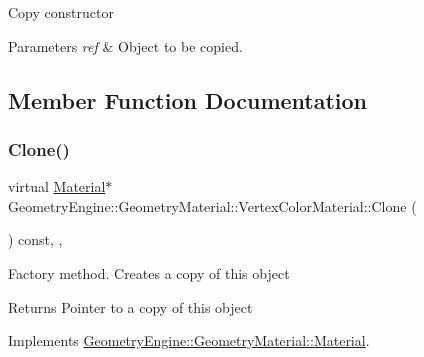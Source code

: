 Copy constructor 
\begin{DoxyParams}{Parameters}
{\em ref} & Object to be copied. \\
\hline
\end{DoxyParams}


\subsection{Member Function Documentation}
\mbox{\label{class_geometry_engine_1_1_geometry_material_1_1_vertex_color_material_aecf808e45985f2a39662937fc18a21d0}} 
\subsubsection{\texorpdfstring{Clone()}{Clone()}}
{\footnotesize\ttfamily virtual \mbox{\hyperlink{class_geometry_engine_1_1_geometry_material_1_1_material}{Material}}$\ast$ Geometry\+Engine\+::\+Geometry\+Material\+::\+Vertex\+Color\+Material\+::\+Clone (\begin{DoxyParamCaption}{ }\end{DoxyParamCaption}) const\hspace{0.3cm}{\ttfamily [inline]}, {\ttfamily [override]}, {\ttfamily [virtual]}}

Factory method. Creates a copy of this object \begin{DoxyReturn}{Returns}
Pointer to a copy of this object 
\end{DoxyReturn}


Implements \mbox{\hyperlink{class_geometry_engine_1_1_geometry_material_1_1_material_ae5513ff06d536365e18ddc5e07e79784}{Geometry\+Engine\+::\+Geometry\+Material\+::\+Material}}.

\mbox{\label{class_geometry_engine_1_1_geometry_material_1_1_vertex_color_material_ab1a686f175b2e4e0f581a8535450f112}} 
